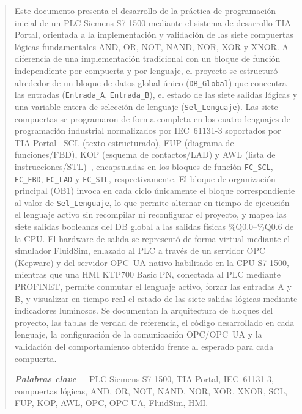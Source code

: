 \documentclass[conference]{IEEEtran}
\begin{document}
\begin{abstract}
Este documento presenta el desarrollo de la práctica de programación inicial de un PLC Siemens S7-1500 mediante el sistema de desarrollo TIA Portal\textregistered, orientada a la implementación y validación de las siete compuertas lógicas fundamentales AND, OR, NOT, NAND, NOR, XOR y XNOR. A diferencia de una implementación tradicional con un bloque de función independiente por compuerta y por lenguaje, el proyecto se estructuró alrededor de un bloque de datos global único (\texttt{DB\_Global}) que concentra las entradas (\texttt{Entrada\_A}, \texttt{Entrada\_B}), el estado de las siete salidas lógicas y una variable entera de selección de lenguaje (\texttt{Sel\_Lenguaje}). Las siete compuertas se programaron de forma completa en los cuatro lenguajes de programación industrial normalizados por IEC~61131-3 soportados por TIA Portal --SCL (texto estructurado), FUP (diagrama de funciones/FBD), KOP (esquema de contactos/LAD) y AWL (lista de instrucciones/STL)--, encapsuladas en los bloques de función \texttt{FC\_SCL}, \texttt{FC\_FBD}, \texttt{FC\_LAD} y \texttt{FC\_STL}, respectivamente. El bloque de organización principal (OB1) invoca en cada ciclo únicamente el bloque correspondiente al valor de \texttt{Sel\_Lenguaje}, lo que permite alternar en tiempo de ejecución el lenguaje activo sin recompilar ni reconfigurar el proyecto, y mapea las siete salidas booleanas del DB global a las salidas físicas \%Q0.0--\%Q0.6 de la CPU. El hardware de salida se representó de forma virtual mediante el simulador FluidSim\textregistered, enlazado al PLC a través de un servidor OPC (Kepware) y del servidor OPC~UA nativo habilitado en la CPU S7-1500, mientras que una HMI KTP700 Basic PN, conectada al PLC mediante PROFINET, permite conmutar el lenguaje activo, forzar las entradas A y B, y visualizar en tiempo real el estado de las siete salidas lógicas mediante indicadores luminosos. Se documentan la arquitectura de bloques del proyecto, las tablas de verdad de referencia, el código desarrollado en cada lenguaje, la configuración de la comunicación OPC/OPC~UA y la validación del comportamiento obtenido frente al esperado para cada compuerta.

\vspace{1em}
\noindent \textbf{\textit{Palabras clave---}} PLC Siemens S7-1500, TIA Portal, IEC~61131-3, compuertas lógicas, AND, OR, NOT, NAND, NOR, XOR, XNOR, SCL, FUP, KOP, AWL, OPC, OPC UA, FluidSim, HMI.
\end{abstract}
\end{document}

